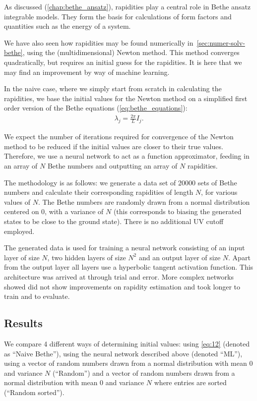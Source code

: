 \documentclass[11pt, a4paper]{report} %
\begin{document}
As discussed (\cref{chap:bethe_ansatz}), rapidities play a central role in Bethe ansatz integrable models.
They form the basis for calculations of form factors and quantities such as the energy of a system.

We have also seen how rapidities may be found numerically in~\cref{sec:numer-solv-bethe}, using the (multidimensional) Newton method.
This method converges quadratically, but requires an initial guess for the rapidities.
It is here that we may find an improvement by way of machine learning.

In the naive case, where we simply start from scratch in calculating the rapidities, we base the initial values for the Newton method on a simplified first order version of the Bethe equations (\cref{eq:bethe_equations}):
\begin{align}
  \label{eq:12}
  \lambda_j = \frac{2\pi}{L} I_j.
\end{align}

We expect the number of iterations required for convergence of the Newton method to be reduced if the initial values are closer to their true values.
Therefore, we use a neural network to act as a function approximator, feeding in an array of \(N\) Bethe numbers and outputting an array of \(N\) rapidities.

The methodology is as follows: we generate a data set of 20000 sets of Bethe numbers and calculate their corresponding rapidities of length \(N\), for various values of \(N\).
The Bethe numbers are randomly drawn from a normal distribution centered on 0, with a variance of \(N\) (this corresponds to biasing the generated states to be close to the ground state).
There is no additional UV cutoff employed.

The generated data is used for training a neural network consisting of an input layer of size \(N\), two hidden layers of size \(N^2\) and an output layer of size \(N\).
Apart from the output layer all layers use a hyperbolic tangent activation function.
This architecture was arrived at through trial and error.
More complex networks showed did not show improvements on rapidity estimation and took longer to train and to evaluate.

\subsection{Results}
We compare 4 different ways of determining initial values: using \cref{eq:12} (denoted as ``Naive Bethe''), using the neural network described above (denoted ``ML''), using a vector of random numbers drawn from a normal distribution with mean 0 and variance \(N\) (``Random'') and a vector of random numbers drawn from a normal distribution with mean 0 and variance \(N\) where entries are sorted (``Random sorted'').
\end{document}
